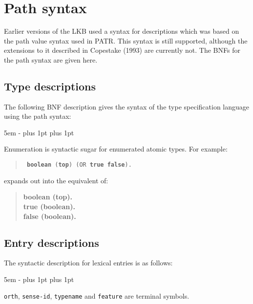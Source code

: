 \documentclass[12pt]{report}
\begin{document}
\chapter{Path syntax}
\label{pathbnf}

Earlier versions of the LKB used a syntax for descriptions
which was based on the path value syntax used in PATR.
This syntax is still supported, although the extensions to it
described in Copestake (1993) are currently not.
The BNFs for the path syntax are given here.

\section{Type descriptions}

The following BNF description gives the syntax of the type specification 
language using the path syntax:
\begin{list}{}
   {\leftmargin 5em
    \itemindent -\leftmargin
    \itemsep 0pt plus 1pt
    \parsep 0pt plus 1pt}
\end{list}
Enumeration is syntactic sugar for enumerated atomic types.  For example:
\begin{quote}
\tt
{\bf boolean} ({\bf top}) (OR {\bf true} {\bf false}).
\end{quote}
expands out into the equivalent of:
\begin{quote}
\bf
{\bf boolean} ({\bf top}).\\
{\bf true} ({\bf boolean}).\\
{\bf false} ({\bf boolean}).
\end{quote}

\section{Entry descriptions}

The syntactic description for lexical entries is as follows:
\begin{list}{}
   {\leftmargin 5em
    \itemindent -\leftmargin
    \itemsep 0pt plus 1pt
    \parsep 0pt plus 1pt}
\end{list}
{\tt orth}, {\tt sense-id},
{\tt typename} and {\tt feature} are 
terminal symbols.
\end{document}
